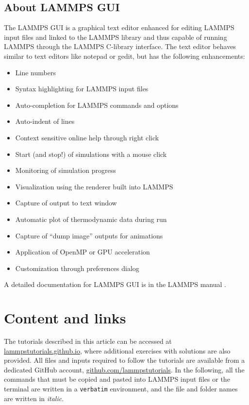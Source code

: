 \documentclass[9pt,tutorial]{livecoms}
\begin{document}
\subsection{About LAMMPS GUI}

The LAMMPS GUI is a graphical text editor enhanced for editing LAMMPS input files and linked to the LAMMPS library and thus capable of running LAMMPS through the LAMMPS C-library interface.  The text editor behaves similar to text editors like notepad or gedit, but has the following enhancements:
\begin{itemize}
\item Line numbers
\item Syntax highlighting for LAMMPS input files
\item Auto-completion for LAMMPS commands and options
\item Auto-indent of lines
\item Context sensitive online help through right click
\item Start (and stop!) of simulations with a mouse click
\item Monitoring of simulation progress
\item Visualization using the renderer built into LAMMPS
\item Capture of output to text window
\item Automatic plot of thermodynamic data during run
\item Capture of ``dump image'' outputs for animations
\item Application of OpenMP or GPU acceleration
\item Customization through preferences dialog
\end{itemize}

A detailed documentation for LAMMPS GUI is in the LAMMPS manual \cite{lammps_gui_docs}.

\section{Content and links}

The tutorials described in this article can be accessed at \href{https://lammpstutorials.github.io}{lammpstutorials.github.io}, where additional exercises with solutions are also provided. All files and inputs required to follow the tutorials are available from a dedicated GitHub account, \href{https://github.com/lammpstutorials}{github.com/lammpstutorials}. In the following, all the commands that must be copied and pasted into LAMMPS input files or the terminal are written in a  \verb+verbatim+ environment, and the file and folder names are written in \textit{italic}.
\end{document}

